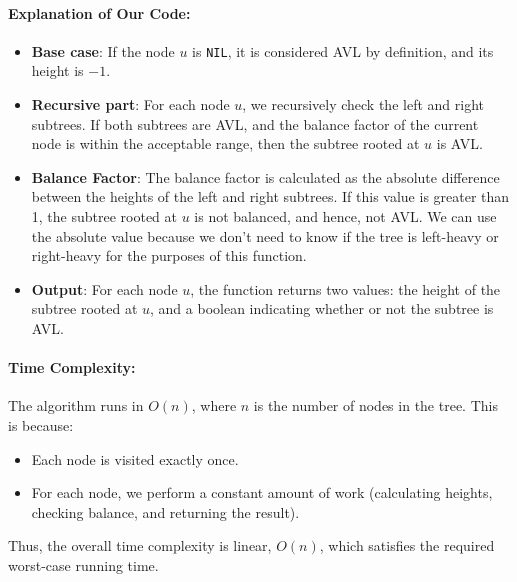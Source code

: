 \documentclass[11pt, a4paper]{article}
\begin{document}
\paragraph{Explanation of Our Code:}
\begin{itemize}
    \item \textbf{Base case}: If the node \( u \) is \texttt{NIL}, it is considered AVL by definition, and its height is \( -1 \).
    \item \textbf{Recursive part}: For each node \( u \), we recursively check the left and right subtrees. If both subtrees are AVL, and the balance factor of the current node is within the acceptable range, then the subtree rooted at \( u \) is AVL.
    \item \textbf{Balance Factor}: The balance factor is calculated as the absolute difference between the heights of the left and right subtrees. If this value is greater than 1, the subtree rooted at \( u \) is not balanced, and hence, not AVL. We can use the absolute value because we don't need to know if the tree is left-heavy or right-heavy for the purposes of this function. 
    \item \textbf{Output}: For each node \( u \), the function returns two values: the height of the subtree rooted at \( u \), and a boolean indicating whether or not the subtree is AVL.
\end{itemize}

\paragraph{Time Complexity:}
The algorithm runs in \( O(n) \), where \( n \) is the number of nodes in the tree. This is because:
\begin{itemize}
    \item Each node is visited exactly once.
    \item For each node, we perform a constant amount of work (calculating heights, checking balance, and returning the result).
\end{itemize}
Thus, the overall time complexity is linear, \( O(n) \), which satisfies the required worst-case running time.
\end{document}
